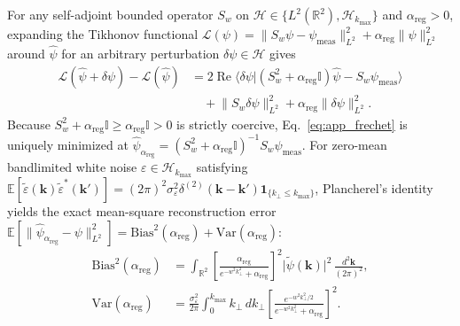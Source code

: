 \documentclass[aps,pra,reprint,nofootinbib,floatfix,longbibliography]{revtex4-2}
\theoremstyle{remark}
\newcommand{\braket}[2]{\langle #1 | #2 \rangle}
\newcommand{\norm}[1]{\lVert #1 \rVert}
\newcommand{\abs}[1]{\lvert #1 \rvert}
\begin{document}
For any self-adjoint bounded operator $S_w$ on $\mathcal{H} \in \{L^2(\mathbb{R}^2), \mathcal{H}_{k_{\max}}\}$ and $\alpha_{\mathrm{reg}} > 0$, expanding the Tikhonov functional $\mathcal{L}(\psi) = \norm{S_w\psi - \psi_{\mathrm{meas}}}_{L^2}^2 + \alpha_{\mathrm{reg}}\norm{\psi}_{L^2}^2$ around $\hat{\psi}$ for an arbitrary perturbation $\delta\psi \in \mathcal{H}$ gives
\begin{align}
\mathcal{L}(\hat{\psi}+\delta\psi) - \mathcal{L}(\hat{\psi}) &= 2\operatorname{Re}\braket{\delta\psi}{(S_w^2 + \alpha_{\mathrm{reg}}\mathbb{I})\hat{\psi} - S_w\psi_{\mathrm{meas}}} \nonumber \\
&\quad + \norm{S_w\delta\psi}_{L^2}^2 + \alpha_{\mathrm{reg}}\norm{\delta\psi}_{L^2}^2.
\label{eq:app_frechet}
\end{align}
Because $S_w^2 + \alpha_{\mathrm{reg}}\mathbb{I} \ge \alpha_{\mathrm{reg}}\mathbb{I} > 0$ is strictly coercive, Eq.~\eqref{eq:app_frechet} is uniquely minimized at $\hat{\psi}_{\alpha_{\mathrm{reg}}} = (S_w^2 + \alpha_{\mathrm{reg}}\mathbb{I})^{-1}S_w\psi_{\mathrm{meas}}$. For zero-mean bandlimited white noise $\varepsilon \in \mathcal{H}_{k_{\max}}$ satisfying $\mathbb{E}[\widetilde{\varepsilon}(\mathbf{k})\widetilde{\varepsilon}^*(\mathbf{k}')] = (2\pi)^2\sigma_\varepsilon^2\delta^{(2)}(\mathbf{k}-\mathbf{k}')\mathbf{1}_{\{k_\perp \le k_{\max}\}}$, Plancherel's identity yields the exact mean-square reconstruction error $\mathbb{E}[\norm{\hat{\psi}_{\alpha_{\mathrm{reg}}} - \psi}_{L^2}^2] = \mathrm{Bias}^2(\alpha_{\mathrm{reg}}) + \mathrm{Var}(\alpha_{\mathrm{reg}})$:
\begin{align}
\mathrm{Bias}^2(\alpha_{\mathrm{reg}}) &= \int_{\mathbb{R}^2} \left[\frac{\alpha_{\mathrm{reg}}}{e^{-w^2 k_\perp^2} + \alpha_{\mathrm{reg}}}\right]^2 \abs{\widetilde{\psi}(\mathbf{k})}^2\,\frac{d^2\mathbf{k}}{(2\pi)^2}, \nonumber \\
\mathrm{Var}(\alpha_{\mathrm{reg}}) &= \frac{\sigma_\varepsilon^2}{2\pi}\int_0^{k_{\max}} k_\perp\,dk_\perp \left[\frac{e^{-w^2 k_\perp^2/2}}{e^{-w^2 k_\perp^2} + \alpha_{\mathrm{reg}}}\right]^2.
\label{eq:app_bias_var_general}
\end{align}
\end{document}
